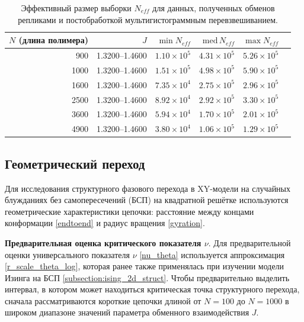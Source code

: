    \begin{table}[htbp]
   	\centering
   	\scriptsize
   	\caption{Эффективный размер выборки $N_{eff}$ для данных, полученных обменов репликами и постобработкой мультигистограммным перевзвешиванием. }
   	\label{tab:xy2d-reweight-neff-by-L}
   	\begin{tabular}{rrrrrr}
   		\toprule
   		$N$ (длина полимера) &   $J$ & $\min N_{eff}$ & $\mathrm{med}\,N_{eff}$ & $\max N_{eff}$ \\
   		\midrule
900 & 1.3200--1.4600 & $1.10\times 10^{5}$ & $4.31\times 10^{5}$ & $5.26\times 10^{5}$ \\
1000 & 1.3200--1.4600 & $1.51\times 10^{5}$ & $4.98\times 10^{5}$ & $5.90\times 10^{5}$ \\
1600 & 1.3200--1.4600 & $7.35\times 10^{4}$ & $2.75\times 10^{5}$ & $2.96\times 10^{5}$ \\
2500 & 1.3200--1.4600 & $8.92\times 10^{4}$ & $2.92\times 10^{5}$ & $3.30\times 10^{5}$ \\
3600 & 1.3200--1.4600 & $5.94\times 10^{4}$ & $1.70\times 10^{5}$ & $2.01\times 10^{5}$ \\
4900 & 1.3200--1.4600 & $3.80\times 10^{4}$ & $1.06\times 10^{5}$ & $1.29\times 10^{5}$ \\

   		\bottomrule
   	\end{tabular}
   \end{table} 
   
   

    

  
 \subsection{Геометрический переход}
 \label{sub:si_xy_2d_geom}

Для исследования структурного фазового перехода в XY-модели на случайных блужданиях без самопересечений (БСП) на квадратной решётке используются геометрические характеристики цепочки: расстояние между концами конформации \eqref{endtoend} и радиус вращения \eqref{gyration}.


 \textbf{Предварительная оценка критического показателя $\nu$}.    
Для предварительной оценки универсального показателя $\nu$  \eqref{nu_theta} используется аппроксимация \eqref{r_scale_theta_log}, которая ранее также применялась при изучении модели Изинга на БСП \ref{subsection:ising_2d_struct}. 
Чтобы предварительно выделить интервал, в котором может находиться критическая точка структурного перехода, сначала рассматриваются короткие цепочки длиной от $N=100$ до $N=1000$ в широком диапазоне значений параметра обменного взаимодействия $J$.


